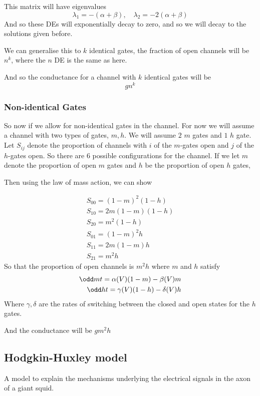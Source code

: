 \documentclass{X:/Documents/Coding/Latex/myassignment}
\begin{document}
This matrix will have eigenvalues
\[\lambda_1 = -(\alpha + \beta), \quad \lambda_2 = -2(\alpha+\beta)\]
And so these DEs will exponentially decay to zero, and so we will decay to the solutions given before.


We can generalise this to $k$ identical gates, the fraction of open channels will be $n^k$, where the $n$ DE is the same as here. 

And so the conductance for a channel with $k$ identical gates will be
\[g n^k\]

\subsubsection{Non-identical Gates}
So now if we allow for non-identical gates in the channel.
For now we will assume a channel with two types of gates, $m,h$. We will assume $2$ $m$ gates and $1$ $h$ gate.
Let $S_{ij}$ denote the proportion of channels with $i$ of the $m$-gates open and $j$ of the $h$-gates open.
So there are 6 possible configurations for the channel.
If we let $m$ denote the proportion of open $m$ gates and $h$ be the proportion of open $h$ gates,

Then using the law of mass action, we can show

\begin{align*}
	S_{00} = (1-m)^2(1-h)\\
	S_{10} = 2m(1-m)(1-h)\\
	S_{20} = m^2(1-h)\\
	S_{01} = (1-m)^2 h\\
	S_{11} = 2m(1-m)h\\
	S_{21} = m^2h
\end{align*}
So that the proportion of open channels is $m^2h$ where $m$ and $h$ satisfy
\begin{align*}
	\odd mt = \alpha(V) (1-m) - \beta(V) m\\
	\odd ht = \gamma(V) (1-h) - \delta(V) h
\end{align*}
Where $\gamma,\delta$ are the rates of switching between the closed and open states for the $h$ gates.

And the conductance will be $g m^2 h$


\subsection{Hodgkin-Huxley model}
A model to explain the mechanisms underlying the electrical signals in the axon of a giant squid.
\end{document}
